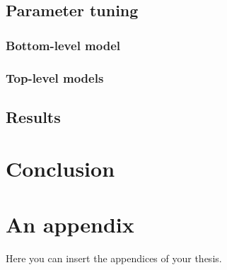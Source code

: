 \documentclass[
  digital, %
  table,   %
  lof,     %
  lot,     %
]{fithesis3}
\begin{document}
\section{Parameter tuning}

\subsection{Bottom-level model}
\label{eval:bottom-model-tuning}

\subsection{Top-level models}

\section{Results}

\chapter{Conclusion}





  \printbibliography[heading=bibintoc] %

  \makeatletter\thesis@blocks@clear\makeatother
  \printindex

\appendix %
\chapter{An appendix}
Here you can insert the appendices of your thesis.
\end{document}
